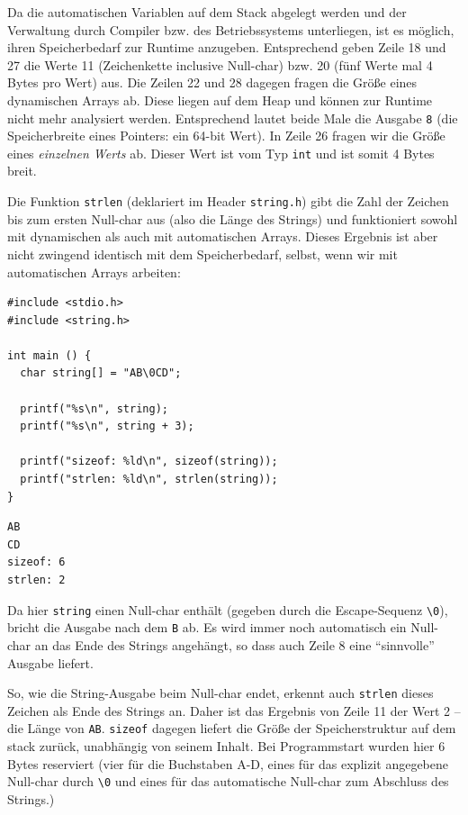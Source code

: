 Da die automatischen Variablen auf dem Stack abgelegt werden und der Verwaltung durch Compiler bzw. des Betriebssystems unterliegen, ist es möglich, ihren Speicherbedarf zur Runtime anzugeben. Entsprechend geben Zeile 18 und 27 die Werte 11 (Zeichenkette inclusive Null-char) bzw. 20 (fünf Werte mal 4 Bytes pro Wert) aus. Die Zeilen 22 und 28 dagegen fragen die Größe eines dynamischen Arrays ab. Diese liegen auf dem Heap und können zur Runtime nicht mehr analysiert werden. Entsprechend lautet beide Male die Ausgabe \texttt{8} (die Speicherbreite eines Pointers: ein 64-bit Wert). In Zeile 26 fragen wir die Größe eines \emph{einzelnen Werts} ab. Dieser Wert ist vom Typ \texttt{int} und ist somit 4 Bytes breit.

Die Funktion \texttt{strlen} (deklariert im Header \texttt{string.h}) gibt die Zahl der Zeichen bis zum ersten Null-char aus (also die Länge des Strings) und funktioniert sowohl mit dynamischen als auch mit automatischen Arrays. Dieses Ergebnis ist aber nicht zwingend identisch mit dem Speicherbedarf, selbst, wenn wir mit automatischen Arrays arbeiten:

\begin{codebox}
\begin{verbatim}
#include <stdio.h>
#include <string.h>

int main () {
  char string[] = "AB\0CD";

  printf("%s\n", string);
  printf("%s\n", string + 3);

  printf("sizeof: %ld\n", sizeof(string));
  printf("strlen: %ld\n", strlen(string));
}
\end{verbatim}
\end{codebox}

\begin{cmdbox}
\begin{verbatim}
AB
CD
sizeof: 6
strlen: 2
\end{verbatim}
\end{cmdbox}

Da hier \texttt{string} einen Null-char enthält (gegeben durch die Escape-Sequenz \texttt{\textbackslash 0}), bricht die Ausgabe nach dem \texttt{B} ab. Es wird immer noch automatisch ein Null-char an das Ende des Strings angehängt, so dass auch Zeile 8 eine \enquote{sinnvolle} Ausgabe liefert.

So, wie die String-Ausgabe beim Null-char endet, erkennt auch \texttt{strlen} dieses Zeichen als Ende des Strings an. Daher ist das Ergebnis von Zeile 11 der Wert 2 -- die Länge von \texttt{AB}. \texttt{sizeof} dagegen liefert die Größe der Speicherstruktur auf dem stack zurück, unabhängig von seinem Inhalt. Bei Programmstart wurden hier 6 Bytes reserviert (vier für die Buchstaben A-D, eines für das explizit angegebene Null-char durch \texttt{\textbackslash 0} und eines für das automatische Null-char zum Abschluss des Strings.)

